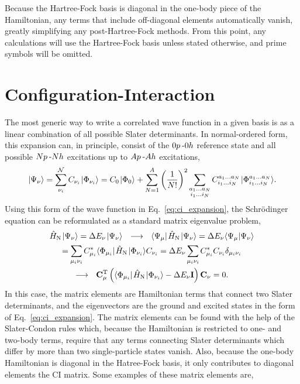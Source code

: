 \documentclass[thesis.tex]{subfiles}
\begin{document}
Because the Hartree-Fock basis is diagonal in the one-body piece of the Hamiltonian, any terms that include off-diagonal elements automatically vanish, greatly simplifying any post-Hartree-Fock methods.  From this point, any calculations will use the Hartree-Fock basis unless stated otherwise, and prime symbols will be omitted.


\section{Configuration-Interaction}
The most generic way to write a correlated wave function in a given basis is as a linear combination of all possible Slater determinants.  In normal-ordered form, this expansion can, in principle, consist of the $0p\hspace{2pt}\text{-}0h$ reference state and all possible $Np\hspace{2pt}\text{-}Nh$ excitations up to $Ap\hspace{2pt}\text{-}Ah$ excitations,
\begin{equation} \label{eq:ci_expansion}
  \hspace{1pt}\lvert \Psi_{\nu} \rangle = \sum_{\nu_{i}}^{\mathcal{N}}C_{\nu_{i}}\hspace{1pt}\lvert \Phi_{\nu_{i}} \rangle = C_{0}\hspace{1pt}\lvert \Phi_{0} \rangle + \sum_{N=1}^{A}\left(\frac{1}{N!}\right)^2 \sum_{\substack{a_{1} \ldots a_{N} \\ i_{1} \ldots i_{N}}} C^{a_{1} \ldots a_{N}}_{i_{1} \ldots i_{N}}\hspace{1pt}\lvert \Phi^{a_{1} \ldots a_{N}}_{i_{1} \ldots i_{N}} \rangle.
\end{equation}
Using this form of the wave function in Eq.\ \eqref{eq:ci_expansion}, the Schr\"{o}dinger equation can be reformulated as a standard matrix eigenvalue problem,
\begin{gather}
  \HamN\ket{\Psi_{\nu}} = \Ecorr_{\nu}\ket{\Psi_{\nu}}\ \ \longrightarrow\ \ \element{\Psi_{\mu}}{\HamN}{\Psi_{\nu}} = \Ecorr_{\nu}\braket{\Psi_{\mu}}{\Psi_{\nu}} \notag \\
  = \sum_{\mathclap{\mu_{i}\nu_{i}}}C^{*}_{\mu_{i}}\element{\Phi_{\mu_{i}}}{\HamN}{\Phi_{\nu_{i}}}C_{\nu_{i}} = \Ecorr_{\nu}\sum_{\mathclap{\mu_{i}\nu_{i}}}C^{*}_{\mu_{i}}C_{\nu_{i}}\delta_{\mu_{i}\nu_{i}} \notag \\
  \longrightarrow\ \ \mathbf{C}^{\text{T}}_{\mu}\left(\element{\Phi_{\mu_{i}}}{\HamN}{\Phi_{\nu_{i}}} - \Ecorr_{\nu}\mathbf{I}\right)\mathbf{C}_{\nu} = 0.
\end{gather}
In this case, the matrix elements are Hamiltonian terms that connect two Slater determinants, and the eigenvectors are the ground and excited states in the form of Eq.\ \eqref{eq:ci_expansion}.  The matrix elements can be found with the help of the Slater-Condon rules \cite{SLATER1929,CONDON1930} which, because the Hamiltonian is restricted to one- and two-body terms, require that any terms connecting Slater determinants which differ by more than two single-particle states vanish.  Also, because the one-body Hamiltonian is diagonal in the Hatree-Fock basis, it only contributes to diagonal elements the CI matrix.  Some examples of these matrix elements are,
\end{document}
